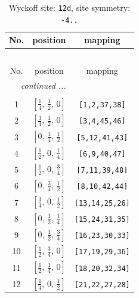 \documentclass[fleqn,8pt]{jsarticle}
\begin{document}
\begin{longtable}{ccc}
\caption{Wyckoff site: {\tt 12d}, site symmetry: {\tt -4..}}
 \\
 \hline \hline
No. & position & mapping \\ \hline \endfirsthead

\multicolumn{2}{l}{\tablename\ \thetable{}} \\
 \hline \hline
No. & position & mapping \\ \hline \endhead

 \hline \hline
\multicolumn{2}{r}{\footnotesize\it continued ...} \\ \endfoot

 \hline \hline
\multicolumn{2}{r}{} \\ \endlastfoot

1 & $\left[ \frac{1}{4},\, \frac{1}{2},\, 0 \right]$ & {\tt [1,2,37,38]} \\ \hline
2 & $\left[ \frac{3}{4},\, \frac{1}{2},\, 0 \right]$ & {\tt [3,4,45,46]} \\ \hline
3 & $\left[ 0,\, \frac{1}{4},\, \frac{1}{2} \right]$ & {\tt [5,12,41,43]} \\ \hline
4 & $\left[ \frac{1}{2},\, 0,\, \frac{1}{4} \right]$ & {\tt [6,9,40,47]} \\ \hline
5 & $\left[ \frac{1}{2},\, 0,\, \frac{3}{4} \right]$ & {\tt [7,11,39,48]} \\ \hline
6 & $\left[ 0,\, \frac{3}{4},\, \frac{1}{2} \right]$ & {\tt [8,10,42,44]} \\ \hline
7 & $\left[ \frac{3}{4},\, 0,\, \frac{1}{2} \right]$ & {\tt [13,14,25,26]} \\ \hline
8 & $\left[ 0,\, \frac{1}{2},\, \frac{1}{4} \right]$ & {\tt [15,24,31,35]} \\ \hline
9 & $\left[ 0,\, \frac{1}{2},\, \frac{3}{4} \right]$ & {\tt [16,23,30,33]} \\ \hline
10 & $\left[ \frac{1}{2},\, \frac{3}{4},\, 0 \right]$ & {\tt [17,19,29,36]} \\ \hline
11 & $\left[ \frac{1}{2},\, \frac{1}{4},\, 0 \right]$ & {\tt [18,20,32,34]} \\ \hline
12 & $\left[ \frac{1}{4},\, 0,\, \frac{1}{2} \right]$ & {\tt [21,22,27,28]} \\
\end{longtable}
\renewcommand{\arraystretch}{1.2}
\end{document}
